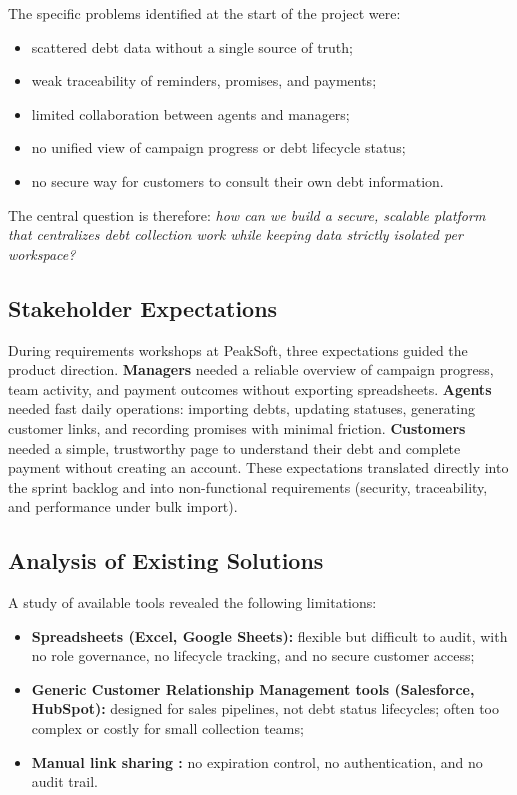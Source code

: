 ﻿\documentclass[12pt,a4paper]{report}
\begin{document}
The specific problems identified at the start of the project were:
\begin{itemize}
  \item scattered debt data without a single source of truth;
  \item weak traceability of reminders, promises, and payments;
  \item limited collaboration between agents and managers;
  \item no unified view of campaign progress or debt lifecycle status;
  \item no secure way for customers to consult their own debt information.
\end{itemize}

The central question is therefore: \emph{how can we build a secure, scalable platform
that centralizes debt collection work while keeping data strictly isolated per workspace?}

\subsection{Stakeholder Expectations}

During requirements workshops at PeakSoft, three expectations guided the product direction.
\textbf{Managers} needed a reliable overview of campaign progress, team activity, and payment
outcomes without exporting spreadsheets.
\textbf{Agents} needed fast daily operations: importing debts, updating statuses, generating
customer links, and recording promises with minimal friction.
\textbf{Customers} needed a simple, trustworthy page to understand their debt and complete
payment without creating an account.
These expectations translated directly into the sprint backlog and into non-functional
requirements (security, traceability, and performance under bulk import).

\subsection{Analysis of Existing Solutions}

A study of available tools revealed the following limitations:
\begin{itemize}
  \item \textbf{Spreadsheets (Excel, Google Sheets):} flexible but difficult to audit,
        with no role governance, no lifecycle tracking, and no secure customer access;
  \item \textbf{Generic Customer Relationship Management tools (Salesforce, HubSpot):} designed for sales pipelines,
        not debt status lifecycles; often too complex or costly for small collection teams;
  \item \textbf{Manual link sharing :} no expiration control,
        no authentication, and no audit trail.
\end{itemize}
\end{document}
